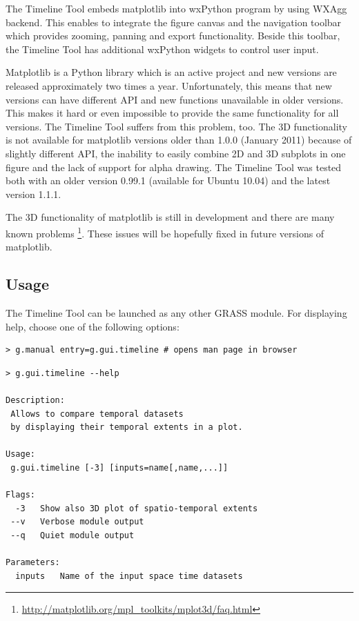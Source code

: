 \documentclass[a4paper,12pt,oneside]{book}
\begin{document}
The Timeline Tool embeds matplotlib into wxPython program by using WXAgg backend.
This enables to integrate the figure canvas and the navigation toolbar
which provides zooming, panning and export functionality.
Beside this toolbar, the Timeline Tool has additional wxPython widgets to control user input.

Matplotlib is a Python library which is an active project and new versions are released approximately two times a year.
Unfortunately, this means that new versions can have different API and new functions unavailable in older versions.
This makes it hard or even impossible to provide the same functionality for all versions.
The Timeline Tool suffers from this problem, too.
The 3D functionality is not available for matplotlib versions older than 1.0.0 (January 2011)
because of slightly different API, the inability to easily combine 2D and 3D subplots in one figure
and the lack of support for alpha drawing.
The Timeline Tool was tested both with an older version 0.99.1 (available for Ubuntu 10.04) and the latest version 1.1.1.

The 3D functionality of matplotlib is still in development and there are many known problems%
\footnote{\url{http://matplotlib.org/mpl_toolkits/mplot3d/faq.html}}.
These issues will be hopefully fixed in future versions of matplotlib.


\subsection{Usage}
The Timeline Tool can be launched as any other GRASS module.
For displaying help, choose one of the following options:
\begin{small}
\begin{lstlisting}[style=mybash]
> g.manual entry=g.gui.timeline # opens man page in browser
\end{lstlisting}
\end{small}

\begin{small}
\begin{lstlisting}[style=mybash]
> g.gui.timeline --help

Description:
 Allows to compare temporal datasets
 by displaying their temporal extents in a plot.

Usage:
 g.gui.timeline [-3] [inputs=name[,name,...]] 

Flags:
  -3   Show also 3D plot of spatio-temporal extents
 --v   Verbose module output
 --q   Quiet module output

Parameters:
  inputs   Name of the input space time datasets

\end{lstlisting}
\end{small}
\end{document}
